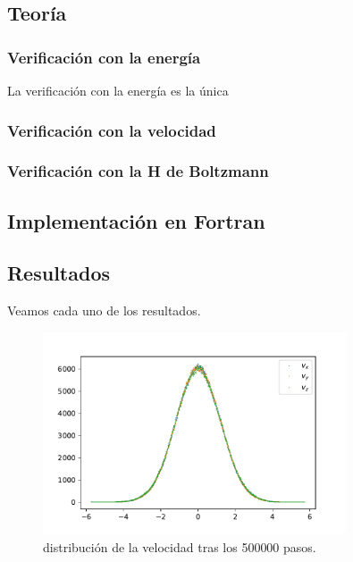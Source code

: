 \documentclass[11pt]{article} %
\begin{document}
\subsection{Teoría}

\cite{Haile}

\subsubsection{Verificación con la energía}

La verificación con la energía es la única 


\subsubsection{Verificación con la velocidad}

\subsubsection{Verificación con la H de Boltzmann}

\subsection{Implementación en Fortran}

\subsection{Resultados}

Veamos cada uno de los resultados. 


\begin{figure}[h!] \centering
	\includegraphics[width=0.8\textwidth]{../../Graficas/Velocidades_histo.pdf}
	\caption{distribución de la velocidad tras los 500000 pasos.}
	\label{Fig:07}
\end{figure}	
\end{document}
